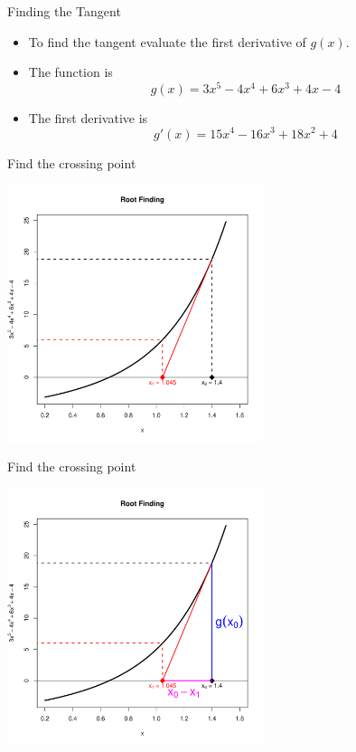 \documentclass[10pt]{beamer}
\begin{document}
\begin{frame}{Finding the Tangent}
  \begin{itemize}
  \item To find the tangent evaluate the first derivative of $g(x)$.

  \item The function is
    \begin{equation}
      g(x)=3x^5-4x^4+6x^3+4x-4
    \end{equation}

  \item The first derivative is
    \begin{equation}
      g'(x)=15x^4-16x^3+18x^2+4
    \end{equation}
  \end{itemize}
\end{frame}
\begin{frame}{Find the crossing point}
  \begin{center}
    \includegraphics[height=7.5cm]{RCode/findtangent1.pdf}
  \end{center}
\end{frame}
\begin{frame}{Find the crossing point}
  \begin{center}
    \includegraphics[height=7.5cm]{RCode/findtangent2.pdf}
  \end{center}
\end{frame}
\end{document}
